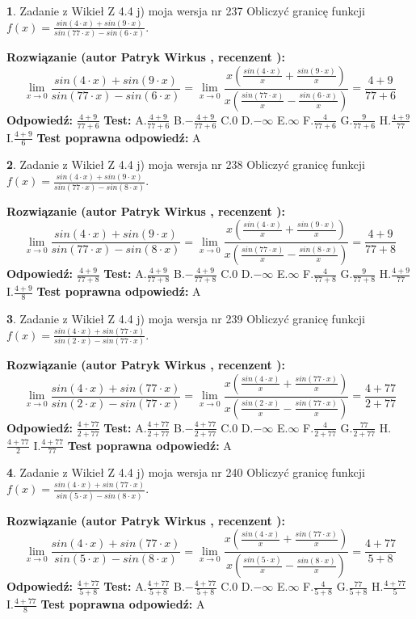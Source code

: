 \documentclass[12pt, a4paper]{article}
\theoremstyle{definition} %
\newtheorem{zad}{}
\newcommand{\zadStart}[1]{\begin{zad}#1\newline}
\newcommand{\zadStop}{\end{zad}}
\newcommand{\rozwStart}[2]{\noindent \textbf{Rozwiązanie (autor #1 , recenzent #2): }\newline}
\newcommand{\rozwStop}{\newline}
\newcommand{\odpStart}{\noindent \textbf{Odpowiedź:}\newline}
\newcommand{\odpStop}{\newline}
\newcommand{\testStart}{\noindent \textbf{Test:}\newline}
\newcommand{\testStop}{\newline}
\newcommand{\kluczStart}{\noindent \textbf{Test poprawna odpowiedź:}\newline}
\newcommand{\kluczStop}{\newline}
\begin{document}
\zadStart{Zadanie z Wikieł Z 4.4 j) moja wersja nr 237}
Obliczyć granicę funkcji $f(x)=\frac{sin(4\cdot x) +sin(9\cdot x)}{sin(77\cdot x) -sin(6\cdot x)}$.
\zadStop
\rozwStart{Patryk Wirkus}{}
$$\lim\limits_{x\to 0}\frac{sin(4\cdot x) +sin(9\cdot x)}{sin(77\cdot x) -sin(6\cdot x)}=\lim\limits_{x\to 0}\frac{x(\frac{sin(4\cdot x)}{x}+\frac{sin(9\cdot x)}{x})}{x(\frac{sin(77\cdot x)}{x}-\frac{sin(6\cdot x)}{x})}=\frac{4+9}{77+6}$$
\rozwStop
\odpStart
$\frac{4+9}{77+6}$
\odpStop
\testStart
A.$\frac{4+9}{77+6}$
B.$-\frac{4+9}{77+6}$
C.$0$
D.$-\infty$
E.$\infty$
F.$\frac{4}{77+6}$
G.$\frac{9}{77+6}$
H.$\frac{4+9}{77}$
I.$\frac{4+9}{6}$
\testStop
\kluczStart
A
\kluczStop



\zadStart{Zadanie z Wikieł Z 4.4 j) moja wersja nr 238}
Obliczyć granicę funkcji $f(x)=\frac{sin(4\cdot x) +sin(9\cdot x)}{sin(77\cdot x) -sin(8\cdot x)}$.
\zadStop
\rozwStart{Patryk Wirkus}{}
$$\lim\limits_{x\to 0}\frac{sin(4\cdot x) +sin(9\cdot x)}{sin(77\cdot x) -sin(8\cdot x)}=\lim\limits_{x\to 0}\frac{x(\frac{sin(4\cdot x)}{x}+\frac{sin(9\cdot x)}{x})}{x(\frac{sin(77\cdot x)}{x}-\frac{sin(8\cdot x)}{x})}=\frac{4+9}{77+8}$$
\rozwStop
\odpStart
$\frac{4+9}{77+8}$
\odpStop
\testStart
A.$\frac{4+9}{77+8}$
B.$-\frac{4+9}{77+8}$
C.$0$
D.$-\infty$
E.$\infty$
F.$\frac{4}{77+8}$
G.$\frac{9}{77+8}$
H.$\frac{4+9}{77}$
I.$\frac{4+9}{8}$
\testStop
\kluczStart
A
\kluczStop



\zadStart{Zadanie z Wikieł Z 4.4 j) moja wersja nr 239}
Obliczyć granicę funkcji $f(x)=\frac{sin(4\cdot x) +sin(77\cdot x)}{sin(2\cdot x) -sin(77\cdot x)}$.
\zadStop
\rozwStart{Patryk Wirkus}{}
$$\lim\limits_{x\to 0}\frac{sin(4\cdot x) +sin(77\cdot x)}{sin(2\cdot x) -sin(77\cdot x)}=\lim\limits_{x\to 0}\frac{x(\frac{sin(4\cdot x)}{x}+\frac{sin(77\cdot x)}{x})}{x(\frac{sin(2\cdot x)}{x}-\frac{sin(77\cdot x)}{x})}=\frac{4+77}{2+77}$$
\rozwStop
\odpStart
$\frac{4+77}{2+77}$
\odpStop
\testStart
A.$\frac{4+77}{2+77}$
B.$-\frac{4+77}{2+77}$
C.$0$
D.$-\infty$
E.$\infty$
F.$\frac{4}{2+77}$
G.$\frac{77}{2+77}$
H.$\frac{4+77}{2}$
I.$\frac{4+77}{77}$
\testStop
\kluczStart
A
\kluczStop



\zadStart{Zadanie z Wikieł Z 4.4 j) moja wersja nr 240}
Obliczyć granicę funkcji $f(x)=\frac{sin(4\cdot x) +sin(77\cdot x)}{sin(5\cdot x) -sin(8\cdot x)}$.
\zadStop
\rozwStart{Patryk Wirkus}{}
$$\lim\limits_{x\to 0}\frac{sin(4\cdot x) +sin(77\cdot x)}{sin(5\cdot x) -sin(8\cdot x)}=\lim\limits_{x\to 0}\frac{x(\frac{sin(4\cdot x)}{x}+\frac{sin(77\cdot x)}{x})}{x(\frac{sin(5\cdot x)}{x}-\frac{sin(8\cdot x)}{x})}=\frac{4+77}{5+8}$$
\rozwStop
\odpStart
$\frac{4+77}{5+8}$
\odpStop
\testStart
A.$\frac{4+77}{5+8}$
B.$-\frac{4+77}{5+8}$
C.$0$
D.$-\infty$
E.$\infty$
F.$\frac{4}{5+8}$
G.$\frac{77}{5+8}$
H.$\frac{4+77}{5}$
I.$\frac{4+77}{8}$
\testStop
\kluczStart
A
\kluczStop
\end{document}
